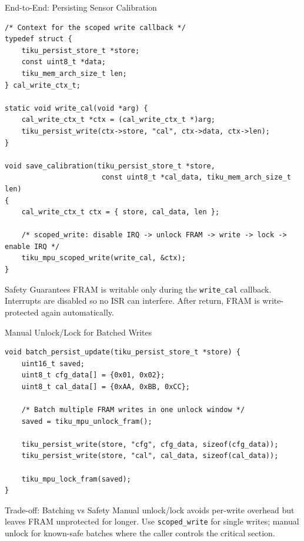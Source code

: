 \documentclass[aspectratio=169, 10pt]{beamer}
\begin{document}
\begin{frame}[fragile]{End-to-End: Persisting Sensor Calibration}
\begin{lstlisting}[style=cstyle]
/* Context for the scoped write callback */
typedef struct {
    tiku_persist_store_t *store;
    const uint8_t *data;
    tiku_mem_arch_size_t len;
} cal_write_ctx_t;

static void write_cal(void *arg) {
    cal_write_ctx_t *ctx = (cal_write_ctx_t *)arg;
    tiku_persist_write(ctx->store, "cal", ctx->data, ctx->len);
}

void save_calibration(tiku_persist_store_t *store,
                       const uint8_t *cal_data, tiku_mem_arch_size_t len)
{
    cal_write_ctx_t ctx = { store, cal_data, len };

    /* scoped_write: disable IRQ -> unlock FRAM -> write -> lock -> enable IRQ */
    tiku_mpu_scoped_write(write_cal, &ctx);
}
\end{lstlisting}

\vspace{0.3em}
\begin{block}{Safety Guarantees}
FRAM is writable only during the \texttt{write\_cal} callback.
Interrupts are disabled so no ISR can interfere. After return,
FRAM is write-protected again automatically.
\end{block}
\end{frame}

\begin{frame}[fragile]{Manual Unlock/Lock for Batched Writes}
\begin{lstlisting}[style=cstyle]
void batch_persist_update(tiku_persist_store_t *store) {
    uint16_t saved;
    uint8_t cfg_data[] = {0x01, 0x02};
    uint8_t cal_data[] = {0xAA, 0xBB, 0xCC};

    /* Batch multiple FRAM writes in one unlock window */
    saved = tiku_mpu_unlock_fram();

    tiku_persist_write(store, "cfg", cfg_data, sizeof(cfg_data));
    tiku_persist_write(store, "cal", cal_data, sizeof(cal_data));

    tiku_mpu_lock_fram(saved);
}
\end{lstlisting}

\vspace{0.3em}
\begin{alertblock}{Trade-off: Batching vs Safety}
Manual unlock/lock avoids per-write overhead but leaves FRAM
unprotected for longer. Use \texttt{scoped\_write} for single writes;
manual unlock for known-safe batches where the caller controls the
critical section.
\end{alertblock}
\end{frame}
\end{document}
